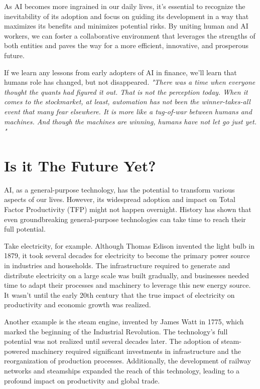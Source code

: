 As AI becomes more ingrained in our daily lives, it's essential to recognize the inevitability of its adoption and focus on guiding its development in a way that maximizes its benefits and minimizes potential risks. By uniting human and AI workers, we can foster a collaborative environment that leverages the strengths of both entities and paves the way for a more efficient, innovative, and prosperous future. 

If we learn any lessons from early adopters of AI in finance, we'll learn that humans role has changed, but not disappeared. \textit{"There was a time when everyone thought the quants had figured it out. That is not the perception today. When it comes to the stockmarket, at least, automation has not been the winner-takes-all event that many fear elsewhere. It is more like a tug-of-war between humans and machines. And though the machines are winning, humans have not let go just yet. "} 

\section{Is it The Future Yet?}

AI, as a general-purpose technology, has the potential to transform various aspects of our lives. However, its widespread adoption and impact on Total Factor Productivity (TFP) might not happen overnight. History has shown that even groundbreaking general-purpose technologies can take time to reach their full potential.

Take electricity, for example. Although Thomas Edison invented the light bulb in 1879, it took several decades for electricity to become the primary power source in industries and households. The infrastructure required to generate and distribute electricity on a large scale was built gradually, and businesses needed time to adapt their processes and machinery to leverage this new energy source. It wasn't until the early 20th century that the true impact of electricity on productivity and economic growth was realized.

Another example is the steam engine, invented by James Watt in 1775, which marked the beginning of the Industrial Revolution. The technology's full potential was not realized until several decades later. The adoption of steam-powered machinery required significant investments in infrastructure and the reorganization of production processes. Additionally, the development of railway networks and steamships expanded the reach of this technology, leading to a profound impact on productivity and global trade.

